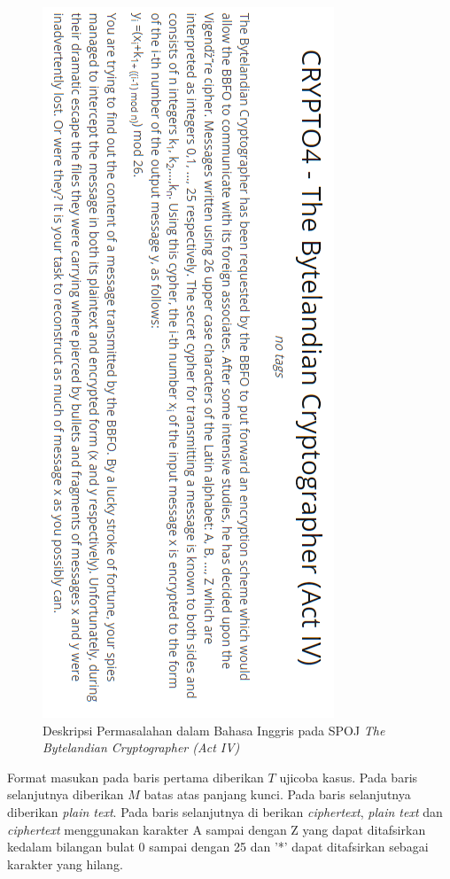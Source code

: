 	\begin{figure}[H]
		\centering
		\includegraphics[scale=0.75]{images/bab2/crypto_def.png}
		\caption{Deskripsi Permasalahan dalam Bahasa Inggris pada SPOJ \textit{The Bytelandian Cryptographer (Act IV)}}
		\label{fig:crypto4_def}
	\end{figure}
	
	Format masukan pada baris pertama diberikan $T$ ujicoba kasus. Pada baris selanjutnya diberikan $M$ batas atas panjang kunci. Pada baris selanjutnya diberikan \textit{plain text}. Pada baris selanjutnya di berikan \textit{ciphertext}, \textit{plain text} dan \textit{ciphertext} menggunakan karakter A sampai dengan Z yang dapat ditafsirkan kedalam bilangan bulat 0 sampai dengan 25 dan '*' dapat ditafsirkan sebagai karakter yang hilang.
	
